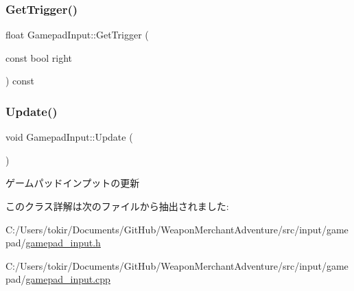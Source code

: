 \mbox{\label{class_gamepad_input_aab528f55fe651996096e697acdec4546}} 
\subsubsection{\texorpdfstring{Get\+Trigger()}{GetTrigger()}}
{\footnotesize\ttfamily float Gamepad\+Input\+::\+Get\+Trigger (\begin{DoxyParamCaption}\item[{const bool}]{right }\end{DoxyParamCaption}) const\hspace{0.3cm}{\ttfamily [inline]}}

\mbox{\label{class_gamepad_input_a3512c0cc4d57534c83db09c4b5377caa}} 
\subsubsection{\texorpdfstring{Update()}{Update()}}
{\footnotesize\ttfamily void Gamepad\+Input\+::\+Update (\begin{DoxyParamCaption}{ }\end{DoxyParamCaption})}



ゲームパッドインプットの更新 



このクラス詳解は次のファイルから抽出されました\+:\begin{DoxyCompactItemize}
\item 
C\+:/\+Users/tokir/\+Documents/\+Git\+Hub/\+Weapon\+Merchant\+Adventure/src/input/gamepad/\mbox{\hyperlink{gamepad__input_8h}{gamepad\+\_\+input.\+h}}\item 
C\+:/\+Users/tokir/\+Documents/\+Git\+Hub/\+Weapon\+Merchant\+Adventure/src/input/gamepad/\mbox{\hyperlink{gamepad__input_8cpp}{gamepad\+\_\+input.\+cpp}}\end{DoxyCompactItemize}
